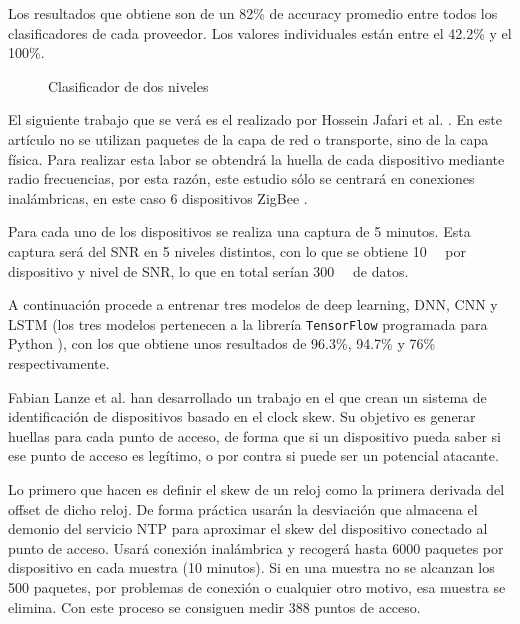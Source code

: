 Los resultados que obtiene son de un 82\% de accuracy promedio entre todos los clasificadores de cada proveedor. Los valores individuales están entre el 42.2\% y el 100\%.

\begin{figure}[htpb!]
    \centering
    \resizebox{0.7\textwidth}{!}{
        
    }
    \caption{Clasificador de dos niveles \cite{aksoy2019automated}}
    \label{fig:askoy_classifier}
\end{figure}

El siguiente trabajo que se verá es el realizado por Hossein Jafari et al. \cite{jafari2018iot}. En este artículo no se utilizan paquetes de la capa de red o transporte, sino de la capa física. Para realizar esta labor se obtendrá la huella de cada dispositivo mediante radio frecuencias, por esta razón, este estudio sólo se centrará en conexiones inalámbricas, en este caso 6 dispositivos ZigBee \cite{gislason2008zigbee}.

Para cada uno de los dispositivos se realiza una captura de 5 minutos. Esta captura será del SNR en 5 niveles distintos, con lo que se obtiene \SI{10}{\giga\byte} por dispositivo y nivel de SNR, lo que en total serían \SI{300}{\giga\byte} de datos.

A continuación procede a entrenar tres modelos de deep learning, DNN, CNN y LSTM (los tres modelos pertenecen a la librería \texttt{TensorFlow} programada para Python \cite{tensorflow2015-whitepaper}), con los que obtiene unos resultados de 96.3\%, 94.7\% y 76\% respectivamente.

Fabian Lanze et al. \cite{lanze2012clock} han desarrollado un trabajo en el que crean un sistema de identificación de dispositivos basado en el clock skew. Su objetivo es generar huellas para cada punto de acceso, de forma que si un dispositivo pueda saber si ese punto de acceso es legítimo, o por contra si puede ser un potencial atacante.

Lo primero que hacen es definir el skew de un reloj como la primera derivada del offset de dicho reloj. De forma práctica usarán la desviación que almacena el demonio del servicio NTP para aproximar el skew del dispositivo conectado al punto de acceso. Usará conexión inalámbrica y recogerá hasta 6000 paquetes por dispositivo en cada muestra (10 minutos). Si en una muestra no se alcanzan los 500 paquetes, por problemas de conexión o cualquier otro motivo, esa muestra se elimina. Con este proceso se consiguen medir 388 puntos de acceso. 

